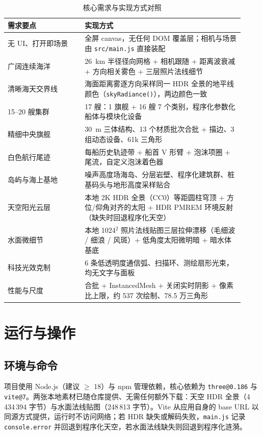 \documentclass[UTF8, a4paper, 11pt]{ctexart}
\newcommand{\file}[1]{\texttt{#1}}
\begin{document}
\begin{table}[H]
\centering
\caption{核心需求与实现方式对照}
\label{tab:req-map}
\small
\begin{tabular}{@{}p{0.30\linewidth}p{0.62\linewidth}@{}}
\toprule
\textbf{需求要点} & \textbf{实现方式} \\
\midrule
无 UI、打开即场景 & 全屏 canvas，无任何 DOM 覆盖层；相机与场景由 \file{src/main.js} 直接装配 \\
广阔连续海洋 & 26~km 半径径向网格 + 相机跟随 + 距离波衰减 + 方向相关雾色 + 三层照片法线细节 \\
清晰海天交界线 & 海面距离雾逐方向采样同一 HDR 全景的地平线颜色（\texttt{skyRadiance()}），两边颜色一致 \\
15--20 艘集群 & 17 艘：1 旗舰 + 16 艘 7 个类别，程序化参数化船体与模块化设备 \\
精细中央旗舰 & 30~m 三体结构、13 个材质批次合批 + 描边、3 组动态设备、61k 三角形 \\
白色航行尾迹 & 每船历史轨迹带 + 船首 V 形臂 + 泡沫项圈 + 尾流，自定义泡沫着色器 \\
岛屿与海上基地 & 噪声高度场海岛、分层岩壁、程序化建筑群、桩基码头与地形高度采样贴合 \\
天空阳光云层 & 本地 2K HDR 全景（CC0）等距圆柱穹顶 + 方位/仰角对齐的太阳 + HDR PMREM 环境反射（缺失时回退程序化天空） \\
水面微细节 & 本地 1024$^2$ 照片法线贴图三层拉伸漂移（毛细波 / 细浪 / 风斑）+ 低角度太阳微明暗 + 暗水体基底 \\
科技光效克制 & 6 条低透明度通信弧、扫描环、测绘扇形光束，均无文字与面板 \\
性能与尺度 & 合批 + InstancedMesh + 关闭实时阴影 + 像素比上限，约 537 次绘制、78.5 万三角形 \\
\bottomrule
\end{tabular}
\end{table}

\section{运行与操作}

\subsection{环境与命令}

项目使用 Node.js（建议 $\ge$ 18）与 npm 管理依赖，核心依赖为 \file{three@0.186} 与 \file{vite@7}。两张本地素材已随仓库提供、无需任何额外下载：天空 HDR 全景（4\,434\,394 字节）与水面法线贴图（248\,813 字节）。Vite 从应用自身的 base URL 以同源方式提供，运行时不访问网络；若 HDR 缺失或解码失败，\file{main.js} 记录 \texttt{console.error} 并回退到程序化天空，若水面法线缺失则回退到程序化涟漪。
\end{document}

